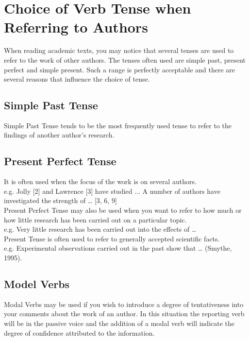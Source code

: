\section{Choice of Verb Tense when Referring to Authors}
When reading academic texts, you may notice that several tenses are used to refer to the work 
of other authors. The tenses often used are simple past, present perfect and simple present. 
Such a range is perfectly acceptable and there are several reasons that influence the choice of tense.

\subsection{Simple Past Tense}
Simple Past Tense tends to be the most frequently used tense to refer to the findings of another 
author's research. 

\subsection{Present Perfect Tense}
It is often used when the focus of the work is on several authors.
\\
e.g. 	
Jolly [2] and Lawrence [3] have studied ...
A number of authors have investigated the strength of … [3, 6, 9]
\\
Present Perfect Tense may also be used when you want to refer to how much or how little 
research has been carried out on a particular topic.
\\
e.g. Very little research has been carried out into the effects of …
\\
Present Tense is often used to refer to generally accepted scientific facts.
\\
e.g. Experimental observations carried out in the past show that … (Smythe, 1995).

\subsection{Model Verbs}
Modal Verbs may be used if you wish to introduce a degree of tentativeness into your comments 
about the work of an author. In this situation the reporting verb will be in the passive voice and
the addition of a modal verb will indicate the degree of confidence attributed to the information.


